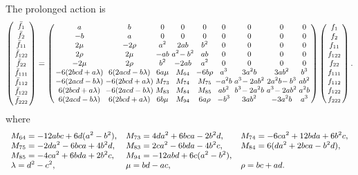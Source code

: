 \documentclass{article}
\begin{document}
The prolonged action is
\begin{equation}
\small
\arraycolsep=1.4pt
\left(
\begin{array}{c}
  \bar f_1 \\ \bar f_2 \\ \bar f_{11} \\ \bar f_{122} \\ \bar f_{22} \\ \bar f_{111} \\ \bar f_{112} \\ \bar f_{122} \\ \bar f_{222} 
 \end{array}
 \right)
 = 
\left(
\begin{array}{ccccccccc}
 a & b & 0 & 0 & 0 & 0 & 0 & 0 & 0 \\
 -b & a & 0 & 0 & 0 & 0 & 0 & 0 & 0 \\
 2\mu & -2 \rho & a^2 & 2 a b & b^2 & 0 & 0 & 0 & 0 \\
 2 \rho & 2\mu & -a b & a^2\!-b^2 & a b & 0 & 0 & 0 & 0 \\
 -2\mu & 2 \rho & b^2 & -2 a b & a^2 & 0 & 0 & 0 & 0 \\
 -6 (2 b c d+a \lambda) & 6 (2 a c d-b\lambda) & 6 a \mu &
  M_{64}  & -6 b \rho & a^3 & 3 a^2 b & 3 a b^2 & b^3 \\
 -6 (2 a c d-b\lambda) & -6 (2 b c d+a \lambda) & M_{73}& M_{74} & 
 M_{75} & -a^2 b & a^3\!-2 a b^2 & 2
   a^2 b\!-b^3 & a b^2 \\
 6 (2 b c d+a \lambda) & -6 (2 a c d-b\lambda) & M_{83} & M_{84} & M_{85} & a b^2 & b^3\!-2
   a^2 b & a^3\!-2 a b^2 & a^2 b \\
 6 (2 a c d-b\lambda) & 6 (2 b c d+a \lambda) & 6 b \mu & 
  M_{94} & 6 a \rho & -b^3 & 3 a b^2 & -3 a^2 b & a^3 \\
\end{array}
\right)\left(
\begin{array}{c}
f_1 \\ f_2 \\ f_{11} \\ f_{122} \\ f_{22} \\ f_{111} \\ f_{112} \\ f_{122} \\ f_{222} 
 \end{array}
 \right).
 \end{equation}
 where
 \begin{equation*}
 \small
 \begin{array}{lll}
M_{64}=-12abc+6d(a^2-b^2), & 
M_{73}=4 d a^2+6 b c a-2 b^2 d, & 
M_{74}=-6 c a^2+12 b d a+6 b^2 c, \\
 M_{75}=-2 d a^2-6 b c a+4 b^2 d, &
 M_{83}=2 c a^2-6 b d a-4 b^2 c, &
 M_{84}=6 (d a^2+2 b c a-b^2 d),\\
 M_{85}=-4 c a^2+6 b d a+2 b^2 c,& 
 M_{94}= -12a b d + 6c(a^2-b^2),\\
\lambda=d^2-c^2, & 
\mu = b d - a c, & 
\rho = b c + a d.
\end{array}
\end{equation*}
\end{document}
